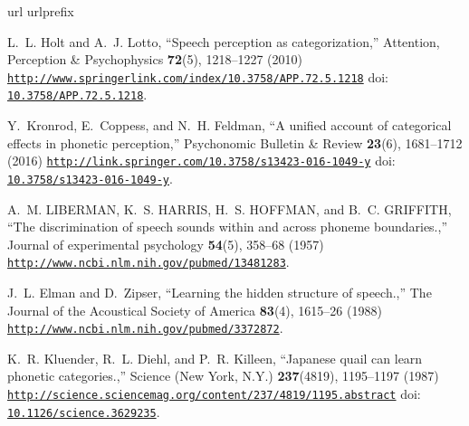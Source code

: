 \documentclass[preprint, NumberedRefs]{JASAnew}\usepackage[]{graphicx}\usepackage[]{color}
\begin{document}
\begin{thebibliography}{10}
\def\enquote#1,{``#1,''}
\expandafter\ifx\csname url\endcsname\relax
  \def\url#1{\texttt{#1}}\fi
\expandafter\ifx\csname urlprefix\endcsname\relax\def\urlprefix{URL }\fi
\providecommand{\bibinfo}[2]{#2}
\def\plainquote#1{``#1''}
\providecommand{\noopsort}[1]{}
\providecommand{\switchargs}[2]{#2#1}
\providecommand{\dourl}[1]{\href{http://#1}{\nolinkurl{#1}}}
\providecommand{\dodoi}[1]{doi: \href{http://dx.doi.org/#1}{\nolinkurl{#1}}}
  \def\eatspace #1{#1}

\bibinfo{author}{L.~L. Holt} and \bibinfo{author}{A.~J. Lotto},
  \enquote{\bibinfo{title}{{Speech perception as categorization}}},
  \bibinfo{journal}{Attention, Perception {\&} Psychophysics} \textbf{72}(5),
  \bibinfo{pages}{1218--1227} (\bibinfo{year}{2010})
  \dourl{http://www.springerlink.com/index/10.3758/APP.72.5.1218}
  \dodoi{10.3758/APP.72.5.1218}.

\bibinfo{author}{Y.~Kronrod}, \bibinfo{author}{E.~Coppess}, and
  \bibinfo{author}{N.~H. Feldman}, \enquote{\bibinfo{title}{{A unified account
  of categorical effects in phonetic perception}}},
  \bibinfo{journal}{Psychonomic Bulletin {\&} Review} \textbf{23}(6),
  \bibinfo{pages}{1681--1712} (\bibinfo{year}{2016})
  \dourl{http://link.springer.com/10.3758/s13423-016-1049-y}
  \dodoi{10.3758/s13423-016-1049-y}.

\bibinfo{author}{A.~M. LIBERMAN}, \bibinfo{author}{K.~S. HARRIS},
  \bibinfo{author}{H.~S. HOFFMAN}, and \bibinfo{author}{B.~C. GRIFFITH},
  \enquote{\bibinfo{title}{{The discrimination of speech sounds within and
  across phoneme boundaries.}}}, \bibinfo{journal}{Journal of experimental
  psychology} \textbf{54}(5), \bibinfo{pages}{358--68} (\bibinfo{year}{1957})
  \dourl{http://www.ncbi.nlm.nih.gov/pubmed/13481283}.

\bibinfo{author}{J.~L. Elman} and \bibinfo{author}{D.~Zipser},
  \enquote{\bibinfo{title}{{Learning the hidden structure of speech.}}},
  \bibinfo{journal}{The Journal of the Acoustical Society of America}
  \textbf{83}(4), \bibinfo{pages}{1615--26} (\bibinfo{year}{1988})
  \dourl{http://www.ncbi.nlm.nih.gov/pubmed/3372872}.

\bibinfo{author}{K.~R. Kluender}, \bibinfo{author}{R.~L. Diehl}, and
  \bibinfo{author}{P.~R. Killeen}, \enquote{\bibinfo{title}{{Japanese quail can
  learn phonetic categories.}}}, \bibinfo{journal}{Science (New York, N.Y.)}
  \textbf{237}(4819), \bibinfo{pages}{1195--1197} (\bibinfo{year}{1987})
  \dourl{http://science.sciencemag.org/content/237/4819/1195.abstract}
  \dodoi{10.1126/science.3629235}.


\end{thebibliography}
\end{document}
